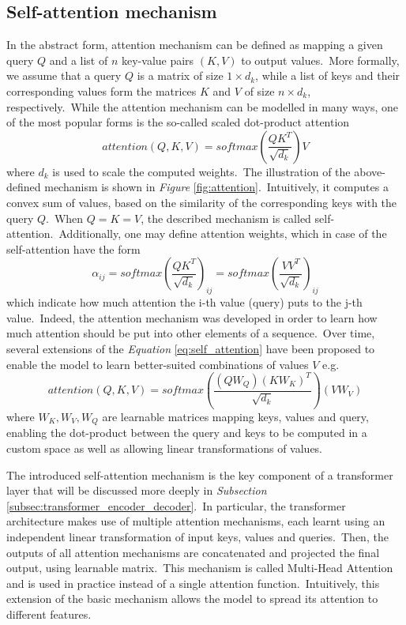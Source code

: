 \documentclass[longabstract, english, mgr]{iithesis}
\theoremstyle{default_theorem_style}\newtheorem{theorem}{Theorem}
\theoremstyle{default_theorem_style}\newtheorem{definition}{Definition}
\begin{document}
\subsection{Self-attention mechanism}\label{subsec:self_attention}

In the abstract form, attention mechanism can be defined as mapping a given query $Q$ and a list of $n$ key-value pairs
$(K, V)$ to output values.\ More formally, we assume that a query $Q$ is a matrix of size $1 \times d_k$, while
a list of keys and their corresponding values form the matrices $K$ and $V$ of size $n \times d_k$,
respectively.\ While the attention mechanism can be modelled in many ways, one of the most popular forms is the
so-called scaled dot-product attention
\begin{equation}\label{eq:self_attention}
attention(Q, K, V) = softmax(\frac{Q K^T}{\sqrt{d_k}}) V
\end{equation}
where $d_k$ is used to scale the computed weights.\ The illustration of the above-defined mechanism is shown in
\textit{Figure} \ref{fig:attention}.\ Intuitively, it computes a convex sum of values, based on the similarity of
the corresponding keys with the query $Q$.\ When $Q = K = V$, the described mechanism is called
self-attention.\ Additionally, one may define attention weights, which in case of the self-attention have the form
$$
\alpha_{ij} = softmax(\frac{Q K^T}{\sqrt{d_k}})_{ij} = softmax(\frac{V V^T}{\sqrt{d_k}})_{ij}
$$
which indicate how much attention the i-th value (query) puts to the j-th value.\ Indeed, the attention mechanism
was developed in order to learn how much attention should be put into other elements of a sequence.\ Over
time, several extensions of the \textit{Equation} \ref{eq:self_attention} have been proposed to enable the model to
learn better-suited combinations of values $V$ e.g.\
$$
attention(Q, K, V) = softmax(\frac{(Q W_Q) (K W_K)^T}{\sqrt{d_k}}) (V W_V)
$$
where $W_K, W_V, W_Q$ are learnable matrices mapping keys, values and query, enabling the dot-product between the
query and keys to be computed in a custom space as well as allowing linear transformations of values.\newline

\noindent The introduced self-attention mechanism is the key component of a transformer layer that will be discussed
more deeply in \textit{Subsection} \ref{subsec:transformer_encoder_decoder}.\ In particular, the transformer
architecture makes use of multiple attention mechanisms, each learnt using an independent linear transformation
of input keys, values and queries.\ Then, the outputs of all attention mechanisms are concatenated and projected the
final output, using learnable matrix.\ This mechanism is called Multi-Head Attention and is used in practice instead
of a single attention function.\ Intuitively, this extension of the basic mechanism allows the model to spread its
attention to different features.
\end{document}
